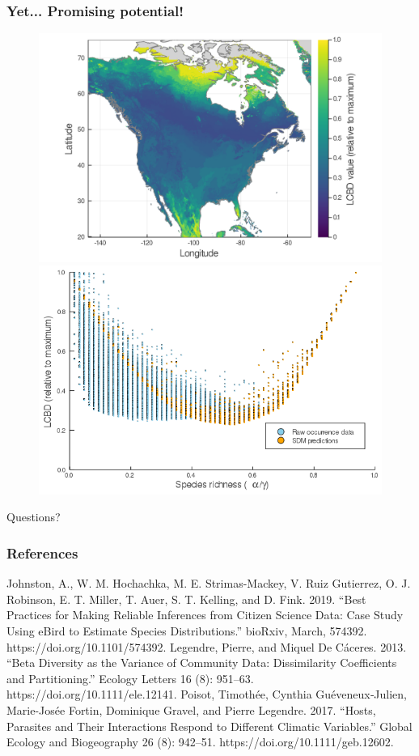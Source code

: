 \documentclass[10pt]{beamer}
\begin{document}
\begin{frame}
  \frametitle{Yet... Promising potential!}
  \begin{figure}
    \centering
    \hspace*{-1cm}\includegraphics[scale=0.09]{fig/05_sdm_lcbd.png}
    \hspace*{-0cm}\includegraphics[scale=0.24]{fig/06_cmb_relation-oneplot.png}
  \end{figure}
  \medskip
  \centering
  \Large Questions?
\end{frame}

\begin{frame}
  \frametitle{References}
  Johnston, A., W. M. Hochachka, M. E. Strimas-Mackey, V. Ruiz Gutierrez, O. J. Robinson, E. T. Miller, T. Auer, S. T. Kelling, and D. Fink. 2019. “Best Practices for Making Reliable Inferences from Citizen Science Data: Case Study Using eBird to Estimate Species Distributions.” bioRxiv, March, 574392. https://doi.org/10.1101/574392.
  \vfill
  Legendre, Pierre, and Miquel De Cáceres. 2013. “Beta Diversity as the Variance of Community Data: Dissimilarity Coefficients and Partitioning.” Ecology Letters 16 (8): 951–63. https://doi.org/10.1111/ele.12141.
  \vfill
  Poisot, Timothée, Cynthia Guéveneux‐Julien, Marie-Josée Fortin, Dominique Gravel, and Pierre Legendre. 2017. “Hosts, Parasites and Their Interactions Respond to Different Climatic Variables.” Global Ecology and Biogeography 26 (8): 942–51. https://doi.org/10.1111/geb.12602.
\end{frame}
\end{document}
